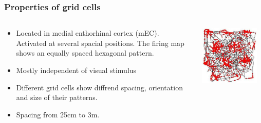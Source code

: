 \documentclass[mathserif]{beamer}
\begin{document}
\begin{frame}
\frametitle{Properties of grid cells}
\begin{columns}[T]
    \begin{column}{.5\textwidth}
			\begin{itemize}
			\item Located in  medial enthorhinal cortex (mEC). Activated at several spacial positions. The firing map shows an equally spaced hexagonal pattern. 
			\item Mostly independent of visual stimulus
			\item Different grid cells show diffrend spacing, orientation and size of their patterns.
			\item Spacing from 25cm to 3m. 
			\end{itemize}
    \end{column}
    \begin{column}{.5\textwidth}
    \includegraphics[width= 0.9\textwidth]{RatRunningPath.JPG}
    \end{column}
  \end{columns}	
\end{frame}
%
%
\end{document}
